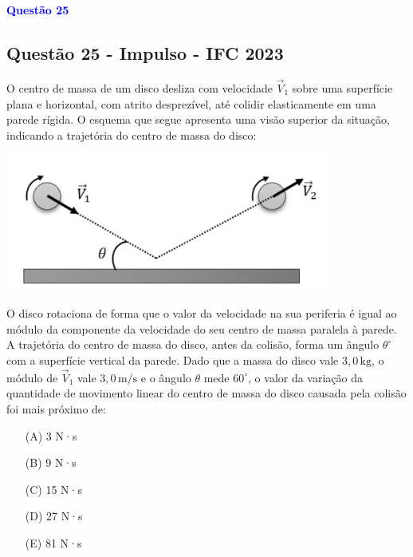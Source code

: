 \documentclass[a4paper,12pt]{article}
\begin{document}
\begin{flushleft}
\textbf{\textcolor{blue}{\Large Quest\~ao 25}}\\
\noindent
\subsection{Quest\~ao 25 - Impulso - IFC 2023}

O centro de massa de um disco desliza com velocidade $\vec{V}_1$ sobre uma superfície 
plana e horizontal, com atrito desprezível, até colidir elasticamente em uma parede 
rígida. O esquema que segue apresenta uma visão superior da situação, indicando a 
trajetória do centro de massa do disco:

\vspace{0.3cm}

\includegraphics[width=0.8\textwidth]{figures/colisao_impulso.png}

\vspace{0.3cm}

O disco rotaciona de forma que o valor da velocidade na sua periferia é igual ao 
módulo da componente da velocidade do seu centro de massa paralela à parede. 
A trajetória do centro de massa do disco, antes da colisão, forma um ângulo 
$\theta^\circ$ com a superfície vertical da parede. Dado que a massa do disco 
vale $3{,}0\,\mathrm{kg}$, o módulo de $\vec{V}_1$ vale $3{,}0\,\mathrm{m/s}$ e 
o ângulo $\theta$ mede $60^\circ$, o valor da variação da quantidade de movimento 
linear do centro de massa do disco causada pela colisão foi mais próximo de:

\begin{itemize}
\item[(A)] 3 N·s
\item[(B)] 9 N·s
\item[(C)] 15 N·s
\item[(D)] 27 N·s
\item[(E)] 81 N·s
\end{itemize}

\vspace{0.5cm}


\end{flushleft}
\end{document}
